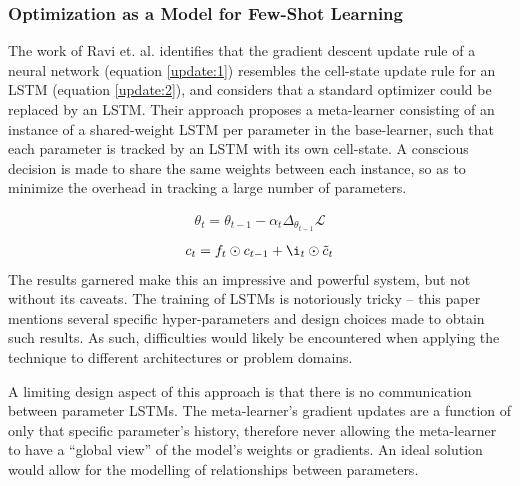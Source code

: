 \documentclass{report}
\begin{document}
\subsubsection{Optimization as a Model for Few-Shot Learning}
The work of Ravi et. al. \parencite{oaamffsl} identifies that the gradient descent update rule of a neural network (equation \ref{update:1}) resembles the cell-state update rule for an LSTM (equation \ref{update:2}), and considers that a standard optimizer could be replaced by an LSTM. Their approach proposes a meta-learner consisting of an instance of a shared-weight LSTM per parameter in the base-learner, such that each parameter is tracked by an LSTM with its own cell-state. A conscious decision is made to share the same weights between each instance, so as to minimize the overhead in tracking a large number of parameters. \par
\begin{align} \label{update:1}
 \theta_{t} = \theta_{t-1}-\alpha_{t}\Delta_{\theta_{t-1}}\mathcal{L}
\end{align}
\begin{align} \label{update:2}
 c_{t} = f_{t}\odot c_{t-1}+\i_{t}\odot \tilde{c}_t
\end{align}
The results garnered make this an impressive and powerful system, but not without its caveats. The training of LSTMs is notoriously tricky -- this paper mentions several specific hyper-parameters and design choices made to obtain such results. As such, difficulties would likely be encountered when applying the technique to different architectures or problem domains. \par
A limiting design aspect of this approach is that there is no communication between parameter LSTMs. The meta-learner's gradient updates are a function of only that specific parameter's history, therefore never allowing the meta-learner to have a ``global view'' of the model's weights or gradients. An ideal solution would allow for the modelling of relationships between parameters. \par
\end{document}
